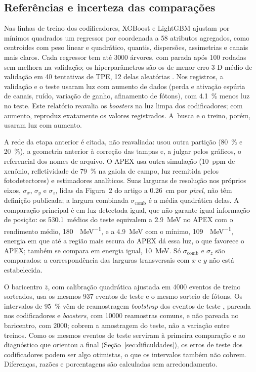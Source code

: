 \subsection{Referências e incerteza das comparações}
\label{sec:protocolo_comparacao}

Nas linhas de treino dos codificadores, XGBoost e LightGBM \cite{chen2016xgboost,ke2017lightgbm} ajustam por mínimos quadrados um regressor por coordenada a \num{58} atributos agregados, como centroides com peso linear e quadrático, quantis, dispersões, assimetrias e canais mais claros. Cada regressor tem até \num{3000} árvores, com parada após \num{100} rodadas sem melhora na validação; os hiperparâmetros são os de menor erro 3-D médio de validação em \num{40} tentativas de TPE, \num{12} delas aleatórias \cite{akiba2019optuna}. Nos registros, a validação e o teste usaram luz com aumento de dados (perda e ativação espúria de canais, ruído, variação de ganho, afinamento de fótons), com \qty{4.1}{\percent} menos luz no teste. Este relatório reavalia os \textit{boosters} na luz limpa dos codificadores; com aumento, reproduz exatamente os valores registrados. A~busca e o treino, porém, usaram luz com aumento.

A rede da etapa anterior \cite{vicentin2024study} é citada, não reavaliada: usou outra partição (\qty{80}{\percent} e \qty{20}{\percent}), a geometria anterior à correção das tampas e, a julgar pelos gráficos, o referencial dos nomes de arquivo. O APEX \cite{marinho2025apex} usa outra simulação (\qty{10}{ppm} de xenônio, refletividade de \qty{79}{\percent} na gaiola de campo, luz reemitida pelos fotodetectores) e estimadores analíticos. Suas larguras de resolução nos próprios eixos, $\sigma_x$, $\sigma_y$ e $\sigma_z$, lidas da Figura~2 do artigo a \qty{0.26}{\cm} por \textit{pixel}, não têm definição publicada; a largura combinada $\sigma_{\mathrm{comb}}$ é a média quadrática delas. A comparação principal é em luz detectada igual, que não garante igual informação de posição: os \qty{530.1}{\pe}\ médios do teste equivalem a \qty{2.9}{\MeV} no APEX com o rendimento médio, \qty{180}{\pe\per\MeV}, e a \qty{4.9}{\MeV} com o mínimo, \qty{109}{\pe\per\MeV}, energia em que até a região mais escura do APEX dá essa luz, o que favorece o APEX; também se compara em energia igual, \qty{10}{\MeV}. Só $\sigma_{\mathrm{comb}}$ e $\sigma_z$ são comparados: a correspondência das larguras transversais com $x$ e $y$ não está estabelecida.

O baricentro $\bar{z}$, com calibração quadrática ajustada em \num{4000} eventos de treino sorteados, usa os mesmos \num{937} eventos de teste e o mesmo sorteio de fótons. Os intervalos de \qty{95}{\percent} vêm de reamostragem \textit{bootstrap} dos eventos de teste \cite{efron1979bootstrap}, pareada nos codificadores e \textit{boosters}, com \num{10000} reamostras comuns, e não pareada no baricentro, com \num{2000}; cobrem a amostragem do teste, não a variação entre treinos. Como os mesmos eventos de teste serviram à primeira comparação e ao diagnóstico que orientou a final (Seção~\ref{sec:dificuldades}), os erros de teste dos codificadores podem ser algo otimistas, o que os intervalos também não cobrem. Diferenças, razões e porcentagens são calculadas sem arredondamento.
